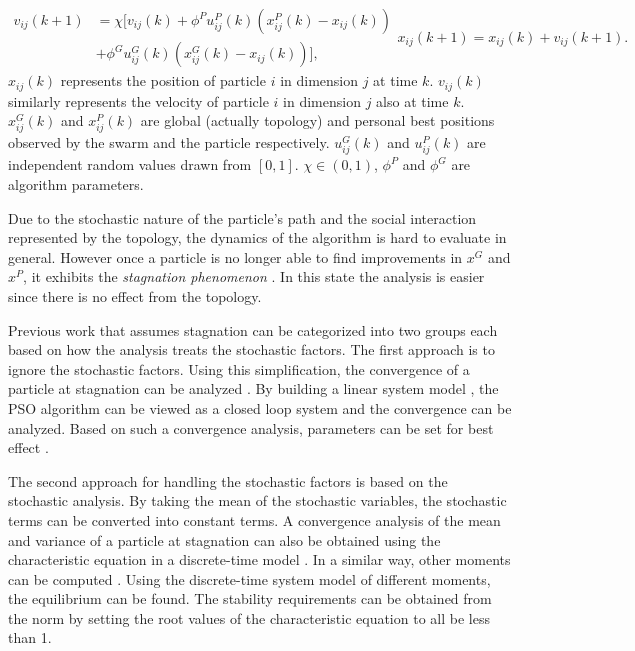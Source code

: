 \documentclass{sig-alternate}
\begin{document}
\begin{subequations}
\label{eq:pso_alg}
\begin{equation}
\label{eq:up_vel}
\begin{aligned}
v_{ij}(k+1) & = \chi [ v_{ij}(k) 
+ \phi^{P} u^{P}_{ij}(k) (x^{P}_{ij}(k) - x_{ij}(k))
\\ & + \phi^{G} u^{G}_{ij}(k) ( x^{G}_{ij}(k) - x_{ij}(k)) ],
\end{aligned}
\end{equation}
\begin{equation}
\label{eq:up_pos}
x_{ij}(k+1) = x_{ij}(k) + v_{ij}(k+1).
\end{equation}
\end{subequations}
$ x_{ij}(k) $ represents the position of particle $ i $ in dimension $ j $ at time $ k $.
$ v_{ij}(k) $ similarly represents the velocity of particle $ i $ in dimension $ j $ also at time $ k $.
$ x^{G}_{ij}(k) $ and $ x^{P}_{ij}(k) $ are global (actually topology) and personal best positions observed by the swarm and the particle respectively. 
$ u^{G}_{ij}(k) $ and $ u^{P}_{ij}(k) $ are independent random values drawn from $ [0,1] $.
$ \chi \in ( 0, 1 ) $, $ \phi^{P} $ and $ \phi^{G} $ are algorithm parameters.

Due to the stochastic nature of the particle's path and the social interaction represented by the topology, the dynamics of the algorithm is hard to evaluate in general.
However once a particle is no longer able to find improvements in $ x^{G} $ and $ x^{P} $, it exhibits the \emph{stagnation phenomenon} \cite{Clerc06stagnationanalysis}.
In this state the analysis is easier since there is no effect from the topology.

Previous work that assumes stagnation can be categorized into two groups each based on how the analysis treats the stochastic factors.
The first approach is to ignore the stochastic factors.
Using this simplification, the convergence of a particle at stagnation can be analyzed \cite{985692}. 
By building a linear system model \cite{4424687}, the PSO algorithm can be viewed as a closed loop system and the convergence can be analyzed.
Based on such a convergence analysis, parameters can be set for best effect \cite{Trelea2003317}.

The second approach for handling the stochastic factors is based on the stochastic analysis.
By taking the mean of the stochastic variables, the stochastic terms can be converted into
constant terms.
A convergence analysis of the mean and variance of a particle at stagnation can also be obtained using the characteristic equation in a discrete-time model 
\cite{Jiang20078}.
In a similar way, 
other moments can be computed
\cite{5175367,Poli:2007:EAS:1276958.1276977,Poli:2008:DSS:1384929.1384944}.
Using the discrete-time system model of different moments, the equilibrium can be found.
The stability requirements can be obtained from the norm by setting the root values of the characteristic equation to all be less than 1.
\end{document}
